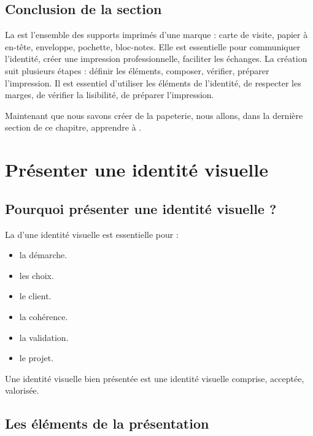 \subsection*{Conclusion de la section}

La  est l'ensemble des supports imprimés d'une marque : carte de visite, papier à en-tête, enveloppe, pochette, bloc-notes. Elle est essentielle pour communiquer l'identité, créer une impression professionnelle, faciliter les échanges. La création suit plusieurs étapes : définir les éléments, composer, vérifier, préparer l'impression. Il est essentiel d'utiliser les éléments de l'identité, de respecter les marges, de vérifier la lisibilité, de préparer l'impression.

Maintenant que nous savons créer de la papeterie, nous allons, dans la dernière section de ce chapitre, apprendre à .

\section{Présenter une identité visuelle}

\subsection{Pourquoi présenter une identité visuelle ?}

La  d'une identité visuelle est essentielle pour :

\begin{itemize}
    \item {} la démarche.
    \item {} les choix.
    \item {} le client.
    \item {} la cohérence.
    \item {} la validation.
    \item {} le projet.
\end{itemize}

Une identité visuelle bien présentée est une identité visuelle comprise, acceptée, valorisée.

\subsection{Les éléments de la présentation}

